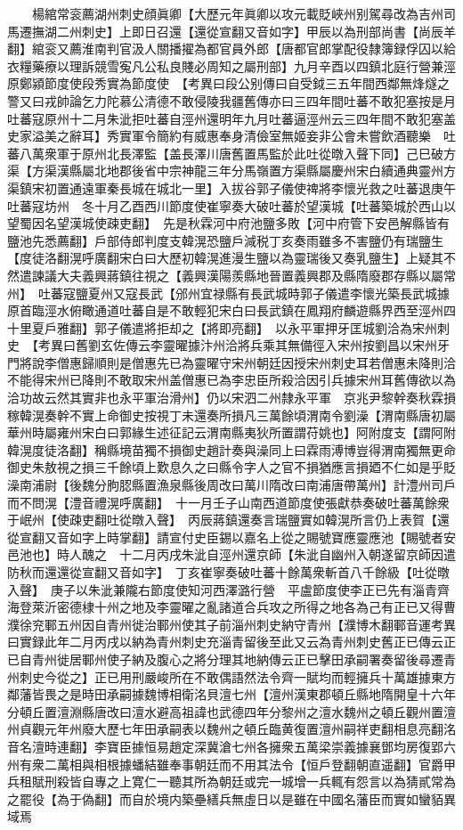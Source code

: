 　　楊綰常衮薦湖州刺史顔眞卿【大歷元年眞卿以攻元載貶峽州别駕尋改為吉州司馬遷撫湖二州刺史】上即日召還【還從宣翻又音如字】甲辰以為刑部尚書【尚辰羊翻】綰衮又薦淮南判官汲人關播擢為都官員外郎【唐都官郎掌配役隸簿録俘囚以給衣糧藥療以理訴競雪寃凡公私良賤必周知之屬刑部】九月辛酉以四鎮北庭行營兼涇原鄭潁節度使段秀實為節度使　【考異曰段公别傳曰自受鉞三五年間西鄰無烽燧之警又曰戎帥論乞力陀慕公清德不敢侵陵我疆舊傳亦曰三四年間吐蕃不敢犯塞按是月吐蕃寇原州十二月朱泚拒吐蕃自涇州還明年九月吐蕃逼涇州云三四年間不敢犯塞盖史家溢美之辭耳】秀實軍令簡約有威惠奉身清儉室無姬妾非公會未嘗飲酒聽樂　吐蕃八萬衆軍于原州北長澤監【盖長澤川唐舊置馬監於此吐從暾入聲下同】己巳破方渠【方渠漢縣屬北地郡後省中宗神龍三年分馬嶺置方渠縣屬慶州宋白續通典靈州方渠鎮宋初置通遠軍秦長城在城北一里】入拔谷郭子儀使禆將李懷光救之吐蕃退庚午吐蕃寇坊州　冬十月乙酉西川節度使崔寧奏大破吐蕃於望漢城【吐蕃築城於西山以望蜀因名望漢城使疎吏翻】　先是秋霖河中府池鹽多敗【河中府管下安邑解縣皆有鹽池先悉薦翻】戶部侍郎判度支韓滉恐鹽戶減税丁亥奏雨雖多不害鹽仍有瑞鹽生【度徒洛翻滉呼廣翻宋白曰大歷初韓滉進漫生鹽以為靈瑞後又奏乳鹽生】上疑其不然遣諫議大夫義興蔣鎮往視之【義興漢陽羨縣地晉置義興郡及縣隋廢郡存縣以屬常州】　吐蕃寇鹽夏州又寇長武【邠州宜禄縣有長武城時郭子儀遣李懷光築長武城據原首臨涇水俯瞰通道吐蕃自是不敢輕犯宋白曰長武鎮在鳳翔府麟遊縣界西至涇州四十里夏戶雅翻】郭子儀遣將拒却之【將即亮翻】　以永平軍押牙匡城劉洽為宋州刺史　【考異曰舊劉玄佐傳云李靈曜據汴州洽將兵乘其無備徑入宋州按劉昌以宋州牙門將說李僧惠歸順則是僧惠先已為靈曜守宋州朝廷因授宋州刺史耳若僧惠未降則洽不能得宋州已降則不敢取宋州盖僧惠已為李忠臣所殺洽因引兵據宋州耳舊傳欲以為洽功故云然其實非也永平軍治滑州】仍以宋泗二州隸永平軍　京兆尹黎幹奏秋霖損稼韓滉奏幹不實上命御史按視丁未還奏所損凡三萬餘頃渭南令劉澡【渭南縣唐初屬華州時屬雍州宋白曰郭緣生述征記云渭南縣夷狄所置謂苻姚也】阿附度支【謂阿附韓滉度徒洛翻】稱縣境苗獨不損御史趙計奏與澡同上曰霖雨溥博豈得渭南獨無更命御史朱敖視之損三千餘頃上歎息久之曰縣令字人之官不損猶應言損廼不仁如是乎貶澡南浦尉【後魏分朐䏰縣置漁泉縣後周改曰萬川隋改曰南浦唐帶萬州】計澧州司戶而不問滉【澧音禮滉呼廣翻】　十一月壬子山南西道節度使張獻恭奏破吐蕃萬餘衆于岷州【使疎吏翻吐從暾入聲】　丙辰蔣鎮還奏言瑞鹽實如韓滉所言仍上表賀【還從宣翻又音如字上時掌翻】請宣付史臣錫以嘉名上從之賜號寶應靈應池【賜號者安邑池也】時人醜之　十二月丙戌朱泚自涇州還京師【朱泚自幽州入朝遂留京師因遣防秋而還還從宣翻又音如字】　丁亥崔寧奏破吐蕃十餘萬衆斬首八千餘級【吐從暾入聲】　庚子以朱泚兼隴右節度使知河西澤潞行營　平盧節度使李正已先有淄青齊海登萊沂密德棣十州之地及李靈曜之亂諸道合兵攻之所得之地各為己有正已又得曹濮徐兖鄆五州因自青州徙治鄆州使其子前淄州刺史納守青州【濮博木翻鄆音運考異曰實録此年二月丙戌以納為青州刺史充淄青留後至此又云為青州刺史舊正已傳云正已自青州徙居鄆州使子納及腹心之將分理其地納傳云正已擊田承嗣署奏留後尋遷青州刺史今從之】正已用刑嚴峻所在不敢偶語然法令齊一賦均而輕擁兵十萬雄據東方鄰藩皆畏之是時田承嗣據魏博相衛洺貝澶七州【澶州漢東郡頓丘縣地隋開皇十六年分頓丘置澶淵縣唐改曰澶水避高祖諱也武德四年分黎州之澶水魏州之頓丘觀州置澶州貞觀元年州廢大歷七年田承嗣表以魏州之頓丘臨黄復置澶州嗣祥吏翻相息亮翻洺音名澶時連翻】李寶臣據恒易趙定深冀滄七州各擁衆五萬梁崇義據襄鄧均房復郢六州有衆二萬相與相根據蟠結雖奉事朝廷而不用其法令【恒戶登翻朝直遥翻】官爵甲兵租賦刑殺皆自專之上寛仁一聽其所為朝廷或完一城增一兵輒有怨言以為猜貳常為之罷役【為于偽翻】而自於境内築壘繕兵無虛日以是雖在中國名藩臣而實如蠻貊異域焉

